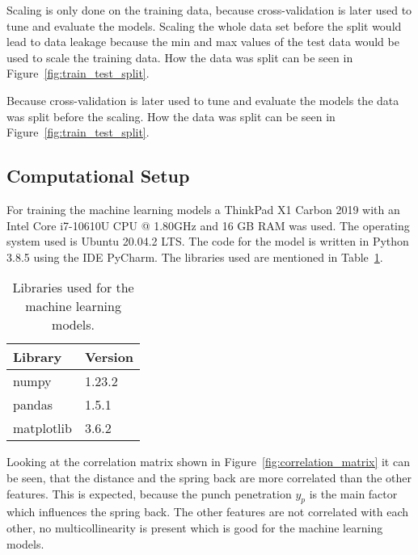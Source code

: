 Scaling is only done on the training data, because cross-validation is later used to tune and evaluate the models. Scaling the whole data set before the split would lead to data leakage because the min and max values of the test data would be used to scale the training data.
How the data was split can be seen in Figure~\ref{fig:train_test_split}.

Because cross-validation is later used to tune and evaluate the models the data was split before the scaling. How the data was split can be seen in Figure~\ref{fig:train_test_split}.



\subsection{Computational Setup}
For training the machine learning models a ThinkPad X1 Carbon 2019 with an Intel Core i7-10610U CPU @ 1.80GHz and 16 GB RAM was used. The operating system used is Ubuntu 20.04.2 LTS. The code for the model is written in Python 3.8.5 using the IDE PyCharm. The libraries used are mentioned in Table~\ref{table:libraries}.

\captionsetup{width=1\textwidth}

\begin{table}[H]
    \centering
    \begin{tabular}{|ll|}
        \hline
        \textbf{Library} & \textbf{Version} \\
        \hline
        numpy            & 1.23.2           \\
        pandas           & 1.5.1            \\
        matplotlib       & 3.6.2            \\ \hline
    \end{tabular}
    \caption{Libraries used for the machine learning models.}
    \label{table:libraries}
\end{table}

Looking at the correlation matrix shown in Figure~\ref*{fig:correlation_matrix} it can be seen, that the distance and the spring back are more correlated than the other features. This is expected, because the punch penetration $y_p$ is the main factor which influences the spring back. The other features are not correlated with each other, no multicollinearity is present which is good for the machine learning models.


